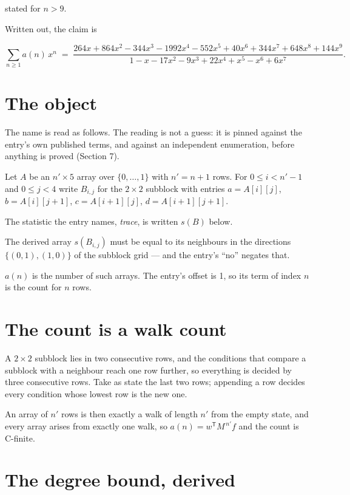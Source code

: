 \documentclass[11pt]{article}
\theoremstyle{definition}
\begin{document}
stated for $n > 9$.

Written out, the claim is

\[\sum_{n \ge 1} a(n)\,x^n \;=\; \frac{264x + 864x^{2} - 344x^{3} - 1992x^{4} - 552x^{5} + 40x^{6} + 344x^{7} + 648x^{8} + 144x^{9}}{1 - x - 17x^{2} - 9x^{3} + 22x^{4} + x^{5} - x^{6} + 6x^{7}}.\]

\section{The object}

The name is read as follows. The reading is not a guess: it is pinned against the entry's own published terms, and against an independent enumeration, before anything is proved (Section 7).

Let $A$ be an $n' \times 5$ array over $\{0,\dots,1\}$ with $n' = n + 1$ rows. For $0 \le i < n'-1$ and $0 \le j < 4$ write $B_{i,j}$ for the $2\times2$ subblock with entries $a = A[i][j]$, $b = A[i][j{+}1]$, $c = A[i{+}1][j]$, $d = A[i{+}1][j{+}1]$.

The statistic the entry names, {\itshape trace}, is written $s(B)$ below.

The derived array $s(B_{i,j})$ must be equal to its neighbours in the directions $\{(0,1), (1,0)\}$ of the subblock grid --- and the entry's ``no'' negates that.

$a(n)$ is the number of such arrays. The entry's offset is 1, so its term of index $n$ is the count for $n$ rows.

\section{The count is a walk count}

A $2\times2$ subblock lies in two consecutive rows, and the conditions that compare a subblock with a neighbour reach one row further, so everything is decided by three consecutive rows. Take as state the last two rows; appending a row decides every condition whose lowest row is the new one.

An array of $n'$ rows is then exactly a walk of length $n'$ from the empty state, and every array arises from exactly one walk, so $a(n) = w^{\mathsf T}M^{\,n'}f$ and the count is C-finite.

\section{The degree bound, derived}
\end{document}
